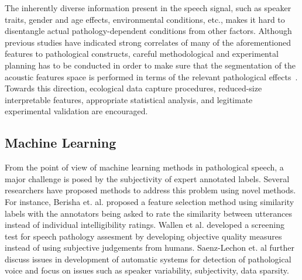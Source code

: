 \documentclass{article}
\begin{document}
The inherently diverse information present in the speech signal, such as speaker traits, gender and age effects, environmental conditions, etc., makes it hard to disentangle actual pathology-dependent conditions from other factors. Although previous studies have indicated strong correlates of many of the aforementioned features to pathological constructs, careful methodological and experimental planning has to be conducted in order to make sure that the segmentation of the acoustic features space is performed in terms of the relevant pathological effects~\cite{bone2013classifying}. Towards this direction, ecological data capture procedures, reduced-size interpretable features, appropriate statistical analysis, and legitimate experimental validation are encouraged.

\subsection{Machine Learning}
From the point of view of machine learning methods in pathological speech, a major challenge is posed by the subjectivity of expert annotated labels.
Several researchers have proposed methods to address this problem using novel methods.
For instance, Berisha et. al. \cite{berisha2014modeling} proposed a feature selection method using similarity labels with the annotators being asked to rate the similarity between utterances instead of individual intelligibility ratings. 
Wallen et al. \cite{wallen1996screening} developed a screening test for speech pathology assesment by developing objective quality measures instead of using subjective judgements from humans.
Saenz-Lechon et. al \cite{saenz2006methodological} further discuss issues in development of automatic systems for detection of pathological voice and focus on issues such as speaker variability, subjectivity, data sparsity.
\end{document}

